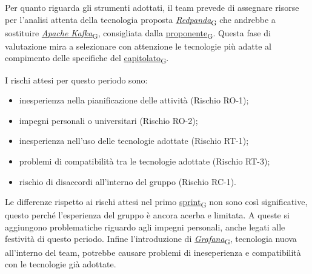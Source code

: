 Per quanto riguarda gli strumenti adottati, il team prevede di assegnare risorse per l'analisi attenta della tecnologia proposta \href{https://7last.github.io/docs/rtb/documentazione-interna/glossario\#redpanda}{\textit{Redpanda}\textsubscript{G}} che andrebbe a sostituire \href{https://7last.github.io/docs/rtb/documentazione-interna/glossario\#apache-kafka}{\textit{Apache Kafka}\textsubscript{G}}, consigliata dalla \href{https://7last.github.io/docs/rtb/documentazione-interna/glossario\#proponente}{proponente\textsubscript{G}}. Questa fase di valutazione mira a selezionare con attenzione le tecnologie più adatte al compimento delle specifiche del \href{https://7last.github.io/docs/rtb/documentazione-interna/glossario\#capitolato}{capitolato\textsubscript{G}}.

I rischi attesi per questo periodo sono:
\begin{itemize}
	\item inesperienza nella pianificazione delle attività (Rischio RO-1);
	\item impegni personali o universitari (Rischio RO-2);
	\item inesperienza nell'uso delle tecnologie adottate (Rischio RT-1);
	\item problemi di compatibilità tra le tecnologie adottate (Rischio RT-3);
	\item rischio di disaccordi all'interno del gruppo (Rischio RC-1).
\end{itemize}
Le differenze rispetto ai rischi attesi nel primo \href{https://7last.github.io/docs/rtb/documentazione-interna/glossario\#sprint}{sprint\textsubscript{G}} non sono così significative, questo perché l'esperienza del gruppo è ancora acerba e limitata.
A queste si aggiungono problematiche riguardo agli impegni personali, anche legati alle festività di questo periodo. Infine l'introduzione di \href{https://7last.github.io/docs/rtb/documentazione-interna/glossario\#grafana}{\textit{Grafana}\textsubscript{G}},
tecnologia nuova all'interno del team, potrebbe causare problemi di ineseperienza e compatibilità con le tecnologie già adottate.


